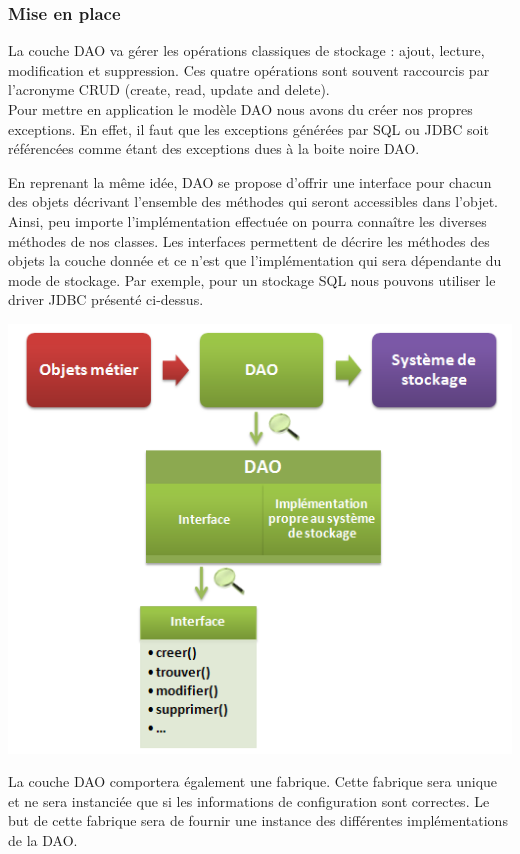 \subsubsection{Mise en place}
La couche DAO va gérer les opérations classiques de stockage : ajout, lecture, modification et suppression. Ces quatre opérations sont souvent raccourcis par l'acronyme CRUD (create, read, update and delete). \\

Pour mettre en application le modèle DAO nous avons du créer nos propres exceptions. En effet, il faut que les exceptions générées par SQL ou JDBC soit référencées comme étant des exceptions dues à la boite noire DAO. 

En reprenant la même idée, DAO se propose d'offrir une interface pour chacun des objets décrivant l'ensemble des méthodes qui seront accessibles dans l'objet. Ainsi, peu importe l'implémentation effectuée on pourra connaître les diverses méthodes de nos classes. Les interfaces permettent de décrire les méthodes des objets la couche donnée et ce n'est que l'implémentation qui sera dépendante du mode de stockage. Par exemple, pour un stockage SQL nous pouvons utiliser le driver JDBC présenté ci-dessus.\\ 
\begin{center}
\includegraphics[scale=0.5]{../graph/dao2.png} \\
\end{center}

La couche DAO comportera également une fabrique. Cette fabrique sera unique et ne sera instanciée que si les informations de configuration sont correctes. Le but de cette fabrique sera de fournir une instance des différentes implémentations de la DAO.


